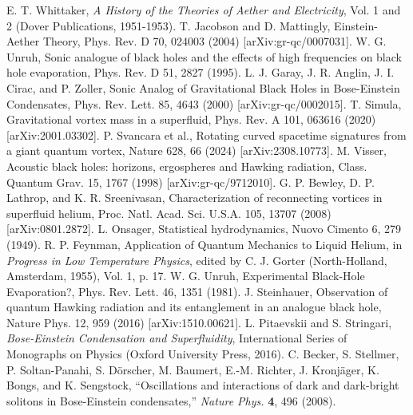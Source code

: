 \begin{thebibliography}{}
 E. T. Whittaker, \emph{A History of the Theories of Aether and Electricity}, Vol. 1 and 2 (Dover Publications, 1951-1953).
 T. Jacobson and D. Mattingly, Einstein-Aether Theory, Phys. Rev. D 70, 024003 (2004) [arXiv:gr-qc/0007031].
 W. G. Unruh, Sonic analogue of black holes and the effects of high frequencies on black hole evaporation, Phys. Rev. D 51, 2827 (1995).
 L. J. Garay, J. R. Anglin, J. I. Cirac, and P. Zoller, Sonic Analog of Gravitational Black Holes in Bose-Einstein Condensates, Phys. Rev. Lett. 85, 4643 (2000) [arXiv:gr-qc/0002015].
 T. Simula, Gravitational vortex mass in a superfluid, Phys. Rev. A 101, 063616 (2020) [arXiv:2001.03302].
 P. Svancara et al., Rotating curved spacetime signatures from a giant quantum vortex, Nature 628, 66 (2024) [arXiv:2308.10773].
 M. Visser, Acoustic black holes: horizons, ergospheres and Hawking radiation, Class. Quantum Grav. 15, 1767 (1998) [arXiv:gr-qc/9712010].
 G. P. Bewley, D. P. Lathrop, and K. R. Sreenivasan, Characterization of reconnecting vortices in superfluid helium, Proc. Natl. Acad. Sci. U.S.A. 105, 13707 (2008) [arXiv:0801.2872].
 L. Onsager, Statistical hydrodynamics, Nuovo Cimento 6, 279 (1949).
 R. P. Feynman, Application of Quantum Mechanics to Liquid Helium, in \emph{Progress in Low Temperature Physics}, edited by C. J. Gorter (North-Holland, Amsterdam, 1955), Vol. 1, p. 17.
 W. G. Unruh, Experimental Black-Hole Evaporation?, Phys. Rev. Lett. 46, 1351 (1981).
 J. Steinhauer, Observation of quantum Hawking radiation and its entanglement in an analogue black hole, Nature Phys. 12, 959 (2016) [arXiv:1510.00621].
 L. Pitaevskii and S. Stringari, \emph{Bose-Einstein Condensation and Superfluidity}, International Series of Monographs on Physics (Oxford University Press, 2016).
 C. Becker, S. Stellmer, P. Soltan-Panahi, S. D\"{o}rscher, M. Baumert, E.-M. Richter, J. Kronj\"{a}ger, K. Bongs, and K. Sengstock, ``Oscillations and interactions of dark and dark-bright solitons in Bose-Einstein condensates,'' \emph{Nature Phys.} \textbf{4}, 496 (2008).
\end{thebibliography}


